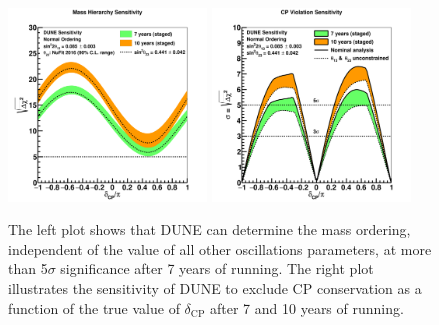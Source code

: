 \begin{figure}[ht]
    \centering
    \includegraphics[width=0.47\textwidth]{figs/mh_2017.png}
    \includegraphics[width=0.47\textwidth]{figs/cpv_2017.png}
    \caption{The left plot shows that DUNE can determine the mass ordering, independent of the value of all other oscillations parameters, at more than 5$\sigma$ significance after 7 years of running. The right plot illustrates the sensitivity of DUNE to exclude  CP conservation as a function of the true value of $\delta_\text{CP}$ after 7 and 10 years of running.}
    \label{fig:physics}
\end{figure}